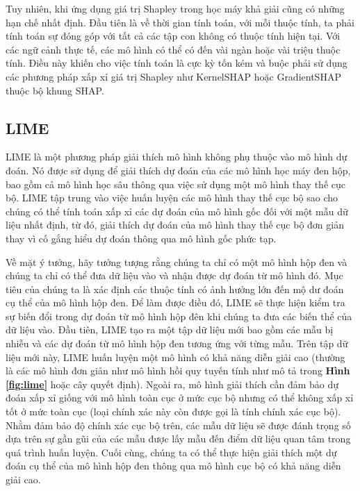 \bigbreak\noindent
Tuy nhiên, khi ứng dụng giá trị Shapley trong học máy khả giải cũng có những hạn chế nhất định. Đầu tiên là về thời gian tính toán, với mỗi thuộc tính, ta phải tính toán sự đóng góp với tất cả các tập con không có thuộc tính hiện tại. Với các ngữ cảnh thực tế, các mô hình có thể có đến vài ngàn hoặc vài triệu thuộc tính. Điều này khiến cho việc tính toán là cực kỳ tốn kém và buộc phải sử dụng các phương pháp xấp xỉ giá trị Shapley như KernelSHAP hoặc GradientSHAP thuộc bộ khung SHAP.%

\subsection{LIME} \label{sec:lime}
LIME \cite{9825734} là một phương pháp giải thích mô hình không phụ thuộc vào mô hình dự đoán. Nó được sử dụng để giải thích dự đoán của các mô hình học máy đen hộp, bao gồm cả mô hình học sâu thông qua việc sử dụng một mô hình thay thế cục bộ. LIME tập trung vào việc huấn luyện các mô hình thay thế cục bộ sao cho chúng có thể tính toán xấp xỉ các dự đoán của mô hình gốc đối với một mẫu dữ liệu nhất định, từ đó, giải thích dự đoán của mô hình thay thế cục bộ đơn giản thay vì cố gắng hiểu dự đoán thông qua mô hình gốc phức tạp.

\bigbreak\noindent
Về mặt ý tưởng, hãy tưởng tượng rằng chúng ta chỉ có một mô hình hộp đen và chúng ta chỉ có thể đưa dữ liệu vào và nhận được dự đoán từ mô hình đó. Mục tiêu của chúng ta là xác định các thuộc tính có ảnh hưởng lớn đến mộ dư đoán cụ thể của mô hình hộp đen. Để làm được điều đó, LIME sẽ thực hiện kiểm tra sự biến đổi trong dự đoán từ mô hình hộp đên khi chúng ta đưa các biến thể của dữ liệu vào. Đầu tiên, LIME tạo ra một tập dữ liệu mới bao gồm các mẫu bị nhiễu và các dự đoán từ mô hình hộp đen tương ứng với từng mẫu. Trên tập dữ liệu mới này, LIME huấn luyện một mô hình có khả năng diễn giải cao (thường là các mô hình đơn giản như mô hình hồi quy tuyến tính như mô tả trong \textbf{Hình \ref{fig:lime}} hoặc cây quyết định). Ngoài ra, mô hình giải thích cần đảm bảo dự đoán xấp xỉ giống với mô hình toàn cục ở mức cục bộ nhưng có thể không xấp xỉ tốt ở mức toàn cục (loại chính xác này còn được gọi là tính chính xác cục bộ). Nhằm đảm bảo độ chính xác cục bộ trên, các mẫu dữ liệu sẽ được đánh trọng số dựa trên sự gần gũi của các mẫu được lấy mẫu đến điểm dữ liệu quan tâm trong quá trình huấn luyện. Cuối cùng, chúng ta có thể thực hiện giải thích một dự đoán cụ thể của mô hình hộp đen thông qua mô hình cục bộ có khả năng diễn giải cao.

